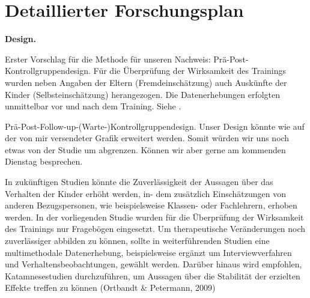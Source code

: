 %
%
\chapter{Detaillierter Forschungsplan}\label{chap.forschungsplan}
\glsresetall
\textbf{Design.} 

Erster Vorschlag für die Methode für unseren Nachweis:\newline
Prä-Post-Kontrollgruppendesign. 
Für die Überprüfung der Wirksamkeit des Trainings wurden neben Angaben der Eltern (Fremdeinschätzung) auch Auskünfte der Kinder (Selbsteinschätzung) herangezogen. Die Datenerhebungen erfolgten unmittelbar vor und nach dem Training. 
Siehe .

Prä-Post-Follow-up-(Warte-)Kontrollgruppendesign. Unser Design könnte wie auf der von mir versendeter Grafik erweitert werden. Somit würden wir uns noch etwas von der Studie um  abgrenzen. Können wir aber gerne am kommenden Dienstag besprechen.

In zukünftigen Studien könnte die Zuverlässigkeit der Aussagen über das Verhalten der Kinder erhöht werden, in- dem zusätzlich Einschätzungen von anderen Bezugspersonen, wie beispielsweise Klassen- oder Fachlehrern, erhoben werden. In der vorliegenden Studie wurden für die Überprüfung der Wirksamkeit des Trainings nur Fragebögen eingesetzt. Um therapeutische Veränderungen noch zuverlässiger abbilden zu können, sollte in weiterführenden Studien eine multimethodale Datenerhebung, beispielsweise ergänzt um Interviewverfahren und Verhaltensbeobachtungen, gewählt werden. Darüber hinaus wird empfohlen, Katamnesestudien durchzuführen, um Aussagen über die Stabilität der erzielten Effekte treffen zu können (Ortbandt \& Petermann, 2009)

